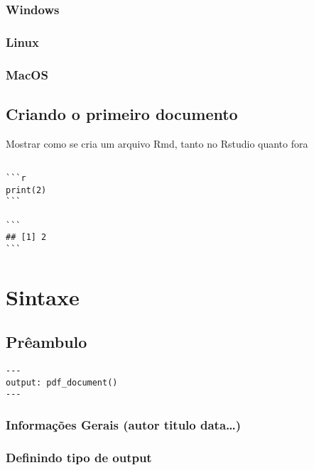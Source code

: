 \documentclass[
]{book}
\begin{document}
\hypertarget{windows}{%
\subsection{Windows}\label{windows}}

\hypertarget{linux}{%
\subsection{Linux}\label{linux}}

\hypertarget{macos}{%
\subsection{MacOS}\label{macos}}

\hypertarget{criando-o-primeiro-documento}{%
\section{Criando o primeiro documento}\label{criando-o-primeiro-documento}}

Mostrar como se cria um arquivo Rmd, tanto no Rstudio quanto fora

\begin{verbatim}

```r
print(2)
```

```
## [1] 2
```

\end{verbatim}

\hypertarget{sintaxe}{%
\chapter{Sintaxe}\label{sintaxe}}

\hypertarget{pruxeaambulo}{%
\section{Prêambulo}\label{pruxeaambulo}}

\begin{verbatim}
---
output: pdf_document()
---
\end{verbatim}

\hypertarget{informauxe7uxf5es-gerais-autor-titulo-data}{%
\subsection{Informações Gerais (autor titulo data\ldots)}\label{informauxe7uxf5es-gerais-autor-titulo-data}}

\hypertarget{definindo-tipo-de-output}{%
\subsection{Definindo tipo de output}\label{definindo-tipo-de-output}}
\end{document}
